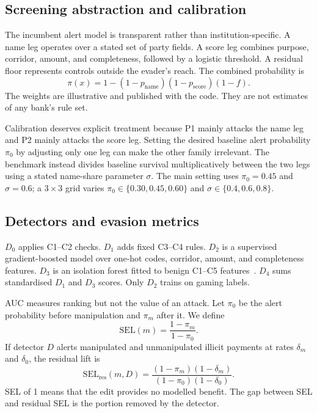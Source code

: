\documentclass[conference]{IEEEtran}
\begin{document}
\subsection{Screening abstraction and calibration}
The incumbent alert model is transparent rather than institution-specific. A
name leg operates over a stated set of party fields. A score leg combines
purpose, corridor, amount, and completeness, followed by a logistic threshold.
A residual floor represents controls outside the evader's reach. The combined
probability is
\begin{equation}
 \pi(x)=1-(1-p_{\mathrm{name}})(1-p_{\mathrm{score}})(1-f).
 \label{eq:screening}
\end{equation}
The weights are illustrative and published with the code. They are not
estimates of any bank's rule set.

Calibration deserves explicit treatment because P1 mainly attacks the name
leg and P2 mainly attacks the score leg. Setting the desired baseline alert
probability $\pi_0$ by adjusting only one leg can make the other family
irrelevant. The benchmark instead divides baseline survival multiplicatively
between the two legs using a stated name-share parameter $\sigma$. The main
setting uses $\pi_0=0.45$ and $\sigma=0.6$; a $3\times3$ grid varies
$\pi_0\in\{0.30,0.45,0.60\}$ and $\sigma\in\{0.4,0.6,0.8\}$.

\subsection{Detectors and evasion metrics}
$D_0$ applies C1--C2 checks. $D_1$ adds fixed C3--C4 rules. $D_2$ is a
supervised gradient-boosted model over one-hot codes, corridor, amount, and
completeness features. $D_3$ is an isolation forest fitted to benign C1--C5
features~\cite{liu2008}. $D_4$ sums standardised $D_1$ and $D_3$ scores. Only
$D_2$ trains on gaming labels.

AUC measures ranking but not the value of an attack. Let $\pi_0$ be the alert
probability before manipulation and $\pi_m$ after it. We define
\begin{equation}
 \mathrm{SEL}(m)=\frac{1-\pi_m}{1-\pi_0}.
 \label{eq:sel}
\end{equation}
If detector $D$ alerts manipulated and unmanipulated illicit payments at rates
$\delta_m$ and $\delta_0$, the residual lift is
\begin{equation}
 \mathrm{SEL}_{\mathrm{res}}(m,D)=
 \frac{(1-\pi_m)(1-\delta_m)}{(1-\pi_0)(1-\delta_0)}.
 \label{eq:selres}
\end{equation}
SEL of 1 means that the edit provides no modelled benefit. The gap between
SEL and residual SEL is the portion removed by the detector.
\end{document}
